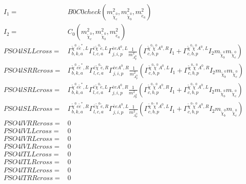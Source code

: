 \documentclass[A4,landscape]{article}
\begin{document}
\begin{align} 
I_1= & B0C0check(m^2_{\tilde{\chi}^0_{{c}}}, m^2_{\tilde{\chi}^0_{{b}}}, m^2_{\tilde{e}_{{a}}}) \\ 
I_2= & C_0(m^2_{\tilde{\chi}^0_{{c}}}, m^2_{\tilde{\chi}^0_{{b}}}, m^2_{\tilde{e}_{{a}}}) \\ 
  PSO4lSLLcross= &  \Gamma^{\tilde{\chi}^0 e \tilde{e}^*,L}_{b, k, a} \Gamma^{\bar{e}\tilde{\chi}^0 \tilde{e} ,L}_{l, c, a} \Gamma^{\bar{e}e A^0 ,L}_{j, i, p} \frac{1}{m^2_{A^0_{{p}}}} (\Gamma^{\tilde{\chi}^0 \tilde{\chi}^0 A^0 ,R}_{c, b, p} I_1 + \Gamma^{\tilde{\chi}^0 \tilde{\chi}^0 A^0 ,L}_{c, b, p} I_2 m_{\tilde{\chi}^0_{{b}}} m_{\tilde{\chi}^0_{{c}}}) \\ 
  PSO4lSRRcross= &  \Gamma^{\tilde{\chi}^0 e \tilde{e}^*,R}_{b, k, a} \Gamma^{\bar{e}\tilde{\chi}^0 \tilde{e} ,R}_{l, c, a} \Gamma^{\bar{e}e A^0 ,R}_{j, i, p} \frac{1}{m^2_{A^0_{{p}}}} (\Gamma^{\tilde{\chi}^0 \tilde{\chi}^0 A^0 ,L}_{c, b, p} I_1 + \Gamma^{\tilde{\chi}^0 \tilde{\chi}^0 A^0 ,R}_{c, b, p} I_2 m_{\tilde{\chi}^0_{{b}}} m_{\tilde{\chi}^0_{{c}}}) \\ 
  PSO4lSRLcross= &  \Gamma^{\tilde{\chi}^0 e \tilde{e}^*,L}_{b, k, a} \Gamma^{\bar{e}\tilde{\chi}^0 \tilde{e} ,L}_{l, c, a} \Gamma^{\bar{e}e A^0 ,R}_{j, i, p} \frac{1}{m^2_{A^0_{{p}}}} (\Gamma^{\tilde{\chi}^0 \tilde{\chi}^0 A^0 ,R}_{c, b, p} I_1 + \Gamma^{\tilde{\chi}^0 \tilde{\chi}^0 A^0 ,L}_{c, b, p} I_2 m_{\tilde{\chi}^0_{{b}}} m_{\tilde{\chi}^0_{{c}}}) \\ 
  PSO4lSLRcross= &  \Gamma^{\tilde{\chi}^0 e \tilde{e}^*,R}_{b, k, a} \Gamma^{\bar{e}\tilde{\chi}^0 \tilde{e} ,R}_{l, c, a} \Gamma^{\bar{e}e A^0 ,L}_{j, i, p} \frac{1}{m^2_{A^0_{{p}}}} (\Gamma^{\tilde{\chi}^0 \tilde{\chi}^0 A^0 ,L}_{c, b, p} I_1 + \Gamma^{\tilde{\chi}^0 \tilde{\chi}^0 A^0 ,R}_{c, b, p} I_2 m_{\tilde{\chi}^0_{{b}}} m_{\tilde{\chi}^0_{{c}}}) \\ 
  PSO4lVRRcross= & 0 \\ 
  PSO4lVLLcross= & 0 \\ 
  PSO4lVRLcross= & 0 \\ 
  PSO4lVLRcross= & 0 \\ 
  PSO4lTLLcross= & 0 \\ 
  PSO4lTLRcross= & 0 \\ 
  PSO4lTRLcross= & 0 \\ 
  PSO4lTRRcross= & 0 \\ 
\end{align} 
\end{document}
